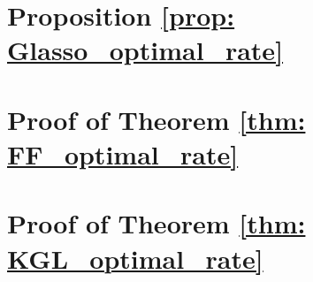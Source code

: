 \documentclass[journal,11pt,draftcls,onecolumn]{IEEEtran}
\begin{document}
\section{Proposition \ref{prop: Glasso_optimal_rate}}


\section{Proof of Theorem \ref{thm: FF_optimal_rate}}


\section{Proof of Theorem \ref{thm: KGL_optimal_rate}}






\end{document}
